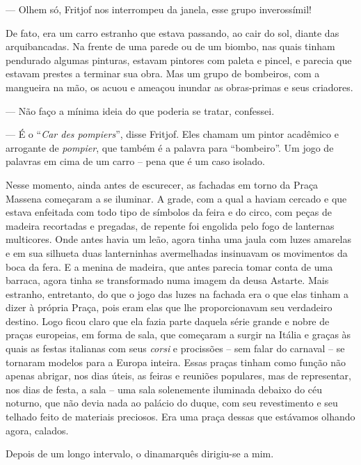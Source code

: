 --- Olhem só, Fritjof nos interrompeu da janela, esse grupo inverossímil!

De fato, era um carro estranho que estava passando, ao cair do sol,
diante das arquibancadas. Na frente de uma parede ou de um biombo, nas
quais tinham pendurado algumas pinturas, estavam pintores com paleta e
pincel, e parecia que estavam prestes a terminar sua obra. Mas um grupo
de bombeiros, com a mangueira na mão, os acuou e ameaçou inundar as
obras-primas e seus criadores.

--- Não faço a mínima ideia do que poderia se tratar, confessei.

--- É o ``\emph{Car des pompiers}'', disse Fritjof. Eles chamam um pintor
acadêmico e arrogante de \emph{pompier}, que também é a palavra para
``bombeiro''. Um jogo de palavras em cima de um carro -- pena que é um
caso isolado.

Nesse momento, ainda antes de escurecer, as fachadas em torno da Praça
Massena começaram a se iluminar. A grade, com a qual a haviam cercado e
que estava enfeitada com todo tipo de símbolos da feira e do circo, com
peças de madeira recortadas e pregadas, de repente foi engolida pelo
fogo de lanternas multicores. Onde antes havia um leão, agora tinha uma
jaula com luzes amarelas e em sua silhueta duas lanterninhas
avermelhadas insinuavam os movimentos da boca da fera. E a menina de
madeira, que antes parecia tomar conta de uma barraca, agora tinha se
transformado numa imagem da deusa Astarte. Mais estranho, entretanto, do
que o jogo das luzes na fachada era o que elas tinham a dizer à própria
Praça, pois eram elas que lhe proporcionavam seu verdadeiro destino.
Logo ficou claro que ela fazia parte daquela série grande e nobre de
praças europeias, em forma de sala, que começaram a surgir na Itália e
graças às quais as festas italianas com seus \emph{corsi} e procissões
-- sem falar do carnaval -- se tornaram modelos para a Europa inteira.
Essas praças tinham como função não apenas abrigar, nos dias úteis, as
feiras e reuniões populares, mas de representar, nos dias de festa, a
sala -- uma sala solenemente iluminada debaixo do céu noturno, que não
devia nada ao palácio do duque, com seu revestimento e seu telhado feito
de materiais preciosos. Era uma praça dessas que estávamos olhando
agora, calados.

Depois de um longo intervalo, o dinamarquês dirigiu-se a mim.

